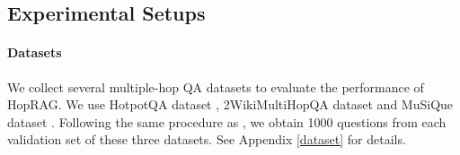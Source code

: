 \begin{table*}[htb]
    \centering
    \caption{We report the QA performance metrics EM and F1 score with GPT-4o and top 20 passages here,  where the best score is in \textbf{bold} and the second best is \underline{underlined}.}
    \label{tab:QA-performance-4o}
\end{table*}

%
\label{sec:experiment}
\subsection{Experimental Setups}
\paragraph{Datasets}
We collect several multiple-hop QA datasets to evaluate the performance of HopRAG. We use HotpotQA dataset \citep{yang2018hotpotqadatasetdiverseexplainable}, 2WikiMultiHopQA dataset \citep{ho2020constructingmultihopqadataset} and MuSiQue dataset  \citep{trivedi2022musiquemultihopquestionssinglehop}. Following the same procedure as \citep{zhang2024sireragindexingsimilarrelated}, we obtain 1000 questions from each validation set of these three datasets. 
See Appendix \ref{dataset} for details.

